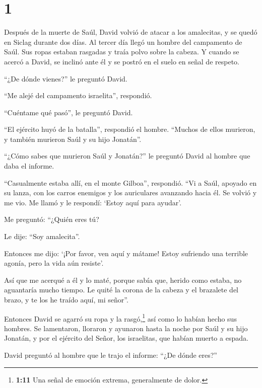 \hypertarget{section}{%
\section{1}\label{section}}

 Después de la muerte de Saúl, David volvió de atacar a los
amalecitas, y se quedó en Siclag durante dos días.  Al
tercer día llegó un hombre del campamento de Saúl. Sus ropas estaban
rasgadas y traía polvo sobre la cabeza. Y cuando se acercó a David, se
inclinó ante él y se postró en el suelo en señal de respeto.

 ``¿De dónde vienes?'' le preguntó David.

``Me alejé del campamento israelita'', respondió.

 ``Cuéntame qué pasó'', le preguntó David.

``El ejército huyó de la batalla'', respondió el hombre. ``Muchos de
ellos murieron, y también murieron Saúl y su hijo Jonatán''.

 ``¿Cómo sabes que murieron Saúl y Jonatán?'' le preguntó
David al hombre que daba el informe.

 ``Casualmente estaba allí, en el monte Gilboa'', respondió.
``Vi a Saúl, apoyado en su lanza, con los carros enemigos y los
auriculares avanzando hacia él.  Se volvió y me vio. Me
llamó y le respondí: `Estoy aquí para ayudar'.

 Me preguntó: ``¿Quién eres tú?

Le dije: ``Soy amalecita''.

 Entonces me dijo: `¡Por favor, ven aquí y mátame! Estoy
sufriendo una terrible agonía, pero la vida aún resiste'.

 Así que me acerqué a él y lo maté, porque sabía que,
herido como estaba, no aguantaría mucho tiempo. Le quité la corona de la
cabeza y el brazalete del brazo, y te los he traído aquí, mi señor''.

 Entonces David se agarró su ropa y la rasgó,\footnote{\textbf{1:11}
  Una señal de emoción extrema, generalmente de dolor.} así como lo
habían hecho sus hombres.  Se lamentaron, lloraron y
ayunaron hasta la noche por Saúl y su hijo Jonatán, y por el ejército
del Señor, los israelitas, que habían muerto a espada.

 David preguntó al hombre que le trajo el informe: ``¿De
dónde eres?''

